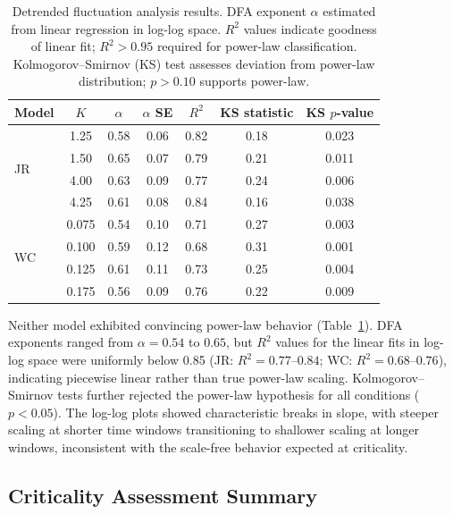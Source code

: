 \documentclass[11pt]{article}
\begin{document}
\begin{table}[H]
\centering
\caption{Detrended fluctuation analysis results. DFA exponent $\alpha$ estimated from linear regression in log-log space. $R^2$ values indicate goodness of linear fit; $R^2 > 0.95$ required for power-law classification. Kolmogorov--Smirnov (KS) test assesses deviation from power-law distribution; $p > 0.10$ supports power-law.}
\label{tab:dfa}
\begin{tabular}{lcccccc}
\toprule
Model & $K$ & $\alpha$ & $\alpha$ SE & $R^2$ & KS statistic & KS $p$-value \\
\midrule
\multirow{4}{*}{JR} & 1.25 & 0.58 & 0.06 & 0.82 & 0.18 & 0.023 \\
 & 1.50 & 0.65 & 0.07 & 0.79 & 0.21 & 0.011 \\
 & 4.00 & 0.63 & 0.09 & 0.77 & 0.24 & 0.006 \\
 & 4.25 & 0.61 & 0.08 & 0.84 & 0.16 & 0.038 \\
\midrule
\multirow{4}{*}{WC} & 0.075 & 0.54 & 0.10 & 0.71 & 0.27 & 0.003 \\
 & 0.100 & 0.59 & 0.12 & 0.68 & 0.31 & 0.001 \\
 & 0.125 & 0.61 & 0.11 & 0.73 & 0.25 & 0.004 \\
 & 0.175 & 0.56 & 0.09 & 0.76 & 0.22 & 0.009 \\
\bottomrule
\end{tabular}
\end{table}

Neither model exhibited convincing power-law behavior (Table~\ref{tab:dfa}). DFA exponents ranged from $\alpha = 0.54$ to $0.65$, but $R^2$ values for the linear fits in log-log space were uniformly below 0.85 (JR: $R^2 = 0.77$--$0.84$; WC: $R^2 = 0.68$--$0.76$), indicating piecewise linear rather than true power-law scaling. Kolmogorov--Smirnov tests further rejected the power-law hypothesis for all conditions ($p < 0.05$). The log-log plots showed characteristic breaks in slope, with steeper scaling at shorter time windows transitioning to shallower scaling at longer windows, inconsistent with the scale-free behavior expected at criticality.

\subsection{Criticality Assessment Summary}
\end{document}
